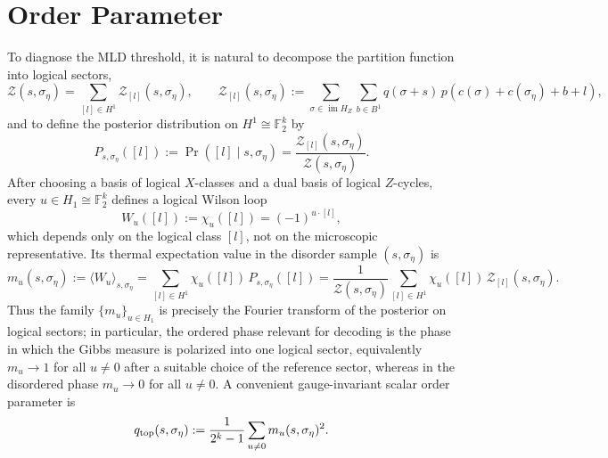 \documentclass[twoside,english,aps,showpacs,pra,superscriptaddress]{revtex4-2}
\DeclareMathOperator{\im}{im}
\begin{document}
\section{Order Parameter}
To diagnose the MLD threshold, it is natural to decompose the partition function into logical sectors,
\begin{equation}
    \mathcal Z(s,\sigma_\eta)=\sum_{[l]\in H^1}\mathcal Z_{[l]}(s,\sigma_\eta),\qquad 
    \mathcal Z_{[l]}(s,\sigma_\eta):=\sum_{\sigma\in \im H_Z}\sum_{b\in B^1} q(\sigma+s)\,p\!\left(c(\sigma)+c(\sigma_\eta)+b+l\right),
\end{equation}
and to define the posterior distribution on \(H^1\cong \mathbb F_2^k\) by
\begin{equation}
    P_{s,\sigma_\eta}([l]):=\Pr([l]\mid s,\sigma_\eta)=\frac{\mathcal Z_{[l]}(s,\sigma_\eta)}{\mathcal Z(s,\sigma_\eta)}.
\end{equation}
After choosing a basis of logical \(X\)-classes and a dual basis of logical \(Z\)-cycles, every \(u\in H_1\cong \mathbb F_2^k\) defines a logical Wilson loop
\begin{equation}
    W_u([l]):=\chi_u([l])=(-1)^{u\cdot [l]},
\end{equation}
which depends only on the logical class \([l]\), not on the microscopic representative. Its thermal expectation value in the disorder sample \((s,\sigma_\eta)\) is
\begin{equation}
    m_u(s,\sigma_\eta):=\langle W_u\rangle_{s,\sigma_\eta}
    =\sum_{[l]\in H^1} \chi_u([l])\,P_{s,\sigma_\eta}([l])
    =\frac{1}{\mathcal Z(s,\sigma_\eta)}\sum_{[l]\in H^1}\chi_u([l])\,\mathcal Z_{[l]}(s,\sigma_\eta).
\end{equation}
Thus the family \(\{m_u\}_{u\in H_1}\) is precisely the Fourier transform of the posterior on logical sectors; in particular, the ordered phase relevant for decoding is the phase in which the Gibbs measure is polarized into one logical sector, equivalently \(m_u\to 1\) for all \(u\neq 0\) after a suitable choice of the reference sector, whereas in the disordered phase \(m_u\to 0\) for all \(u\neq 0\). A convenient gauge-invariant scalar order parameter is
\begin{equation}
    q_{\rm top}(s,\sigma_\eta):=\frac{1}{2^k-1}\sum_{u\neq 0} m_u(s,\sigma_\eta)^2.
\end{equation}
\end{document}
